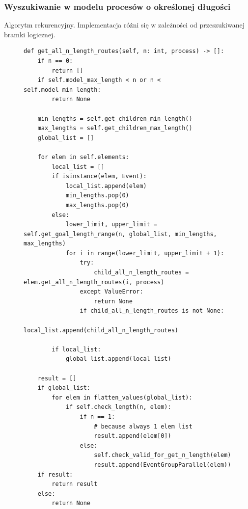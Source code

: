 \subsubsection{Wyszukiwanie w modelu procesów o określonej długości}

Algorytm rekurencyjny. Implementacja różni się w zależności od przeszukiwanej bramki logicznej.
\begin{figure}[!ht]
\lstset{caption=Wyszukiwanie procesów o długości n, captionpos=b}
\lstset{label=src:get_n_length, frame=single}
\begin{lstlisting}
def get_all_n_length_routes(self, n: int, process) -> []:
    if n == 0:
        return []
    if self.model_max_length < n or n < self.model_min_length:
        return None

    min_lengths = self.get_children_min_length()
    max_lengths = self.get_children_max_length()
    global_list = []

    for elem in self.elements:
        local_list = []
        if isinstance(elem, Event):
            local_list.append(elem)
            min_lengths.pop(0)
            max_lengths.pop(0)
        else:
            lower_limit, upper_limit = self.get_goal_length_range(n, global_list, min_lengths, max_lengths)
            for i in range(lower_limit, upper_limit + 1):
                try:
                    child_all_n_length_routes = elem.get_all_n_length_routes(i, process)
                except ValueError:
                    return None
                if child_all_n_length_routes is not None:
                    local_list.append(child_all_n_length_routes)

        if local_list:
            global_list.append(local_list)

    result = []
    if global_list:
        for elem in flatten_values(global_list):
            if self.check_length(n, elem):
                if n == 1:
                    # because always 1 elem list
                    result.append(elem[0])
                else:
                    self.check_valid_for_get_n_length(elem)
                    result.append(EventGroupParallel(elem))
    if result:
        return result
    else:
        return None
\end{lstlisting}
\end{figure}

